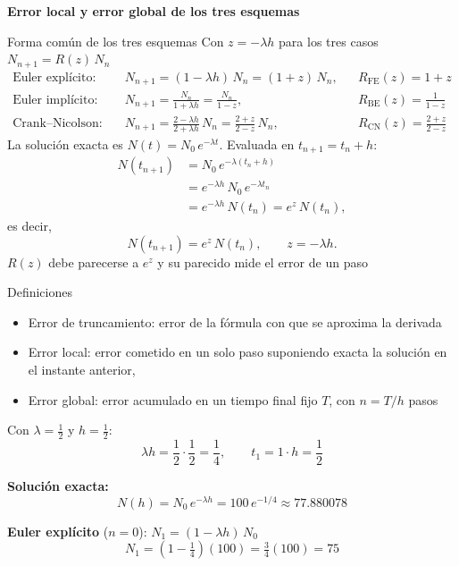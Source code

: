 \textbf{Error local y error global de los tres esquemas}


Forma común de los tres esquemas
Con $z = -\lambda h$ para los tres casos $N_{n+1} = R(z)\,N_n$
\begin{align*}
	\text{Euler explícito:}\quad & N_{n+1} = (1 - \lambda h)\,N_n = (1 + z)\,N_n, && R_{\mathrm{FE}}(z) = 1 + z\\
	\text{Euler implícito:}\quad & N_{n+1} = \frac{N_n}{1 + \lambda h} = \frac{N_n}{1 - z}, && R_{\mathrm{BE}}(z) = \frac{1}{1 - z}\\
	\text{Crank--Nicolson:}\quad & N_{n+1} = \frac{2 - \lambda h}{2 + \lambda h}\,N_n = \frac{2 + z}{2 - z}\,N_n, && R_{\mathrm{CN}}(z) = \frac{2 + z}{2 - z}
\end{align*}
La solución exacta es $N(t)=N_0\,e^{-\lambda t}$. Evaluada en $t_{n+1}=t_n+h$:
\begin{align*}
	N(t_{n+1}) &= N_0\,e^{-\lambda (t_n+h)}\\
	&= e^{-\lambda h}\,N_0\,e^{-\lambda t_n}\\
	&= e^{-\lambda h}\,N(t_n)
	= e^{z}\,N(t_n),
\end{align*}
es decir,
\begin{equation}\label{eq:p01_paso}
	N(t_{n+1}) = e^{z}\,N(t_n), \qquad z=-\lambda h .
\end{equation}
$R(z)$ debe parecerse a $e^{z}$ y su parecido mide el error de un paso

Definiciones
\begin{itemize}
	\item Error de truncamiento: error de la fórmula con que se aproxima la derivada
	\item Error local: error cometido en un solo paso suponiendo exacta la solución en el instante anterior,
	\item Error global: error acumulado en un tiempo final fijo $T$, con $n = T/h$ pasos
\end{itemize}


Con $\lambda = \tfrac12$ y $h = \tfrac12$:
\[
\lambda h = \frac12\cdot\frac12 = \frac14, \qquad t_1 = 1\cdot h = \frac12 
\]

\textbf{Solución exacta:}
\[
N(h) = N_0\,e^{-\lambda h} = 100\,e^{-1/4} \approx 77.880078 
\]

\textbf{Euler explícito} ($n = 0$): $N_1 = (1 - \lambda h)\,N_0$
\[
N_1 = \left(1 - \tfrac14\right)(100) = \tfrac34(100) = 75 
\]

